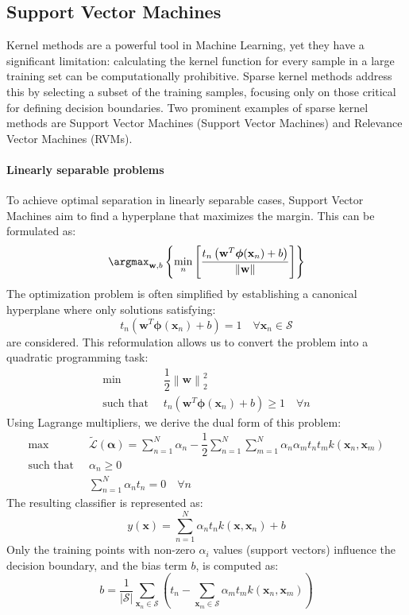 \subsection{Support Vector Machines}
Kernel methods are a powerful tool in Machine Learning, yet they have a significant limitation: calculating the kernel function for every sample in a large training set can be computationally prohibitive.
Sparse kernel methods address this by selecting a subset of the training samples, focusing only on those critical for defining decision boundaries.
Two prominent examples of sparse kernel methods are Support Vector Machines (Support Vector Machines) and Relevance Vector Machines (RVMs).

\paragraph*{Linearly separable problems}
To achieve optimal separation in linearly separable cases, Support Vector Machines aim to find a hyperplane that maximizes the margin. 
This can be formulated as:
\[\argmax_{\mathbf{w},b}\left\{\min_n\left[\dfrac{t_n\left(\mathbf{w}^T\boldsymbol{\phi}(\mathbf{x}_n)+b\right)}{\left\lVert \mathbf{w}\right\rVert }\right]\right\}\]
The optimization problem is often simplified by establishing a canonical hyperplane where only solutions satisfying:
\[t_n\left(\mathbf{w}^T\boldsymbol{\phi}(\mathbf{x}_n)+b\right)=1\quad \forall\mathbf{x}_n\in\mathcal{S}\]
are considered. 
This reformulation allows us to convert the problem into a quadratic programming task:
\begin{align*}
    \min                      \:&\: \dfrac{1}{2}{\left\lVert \mathbf{w}\right\rVert}_2^2          \\
    \text{such that }           &\: t_n\left(\mathbf{w}^T\boldsymbol{\phi}(\mathbf{x}_n)+b\right)\geq 1 \quad\forall n        
\end{align*}  
Using Lagrange multipliers, we derive the dual form of this problem:
\begin{align*}
    \max                      \:&\: \tilde{\mathcal{L}}(\boldsymbol{\alpha})=\sum_{n=1}^N \alpha_n-\dfrac{1}{2}\sum_{n=1}^N\sum_{m=1}^N \alpha_n\alpha_m t_n t_m k(\mathbf{x}_n,\mathbf{x}_m)          \\
    \text{such that }           &\: \alpha_n\geq 0 \\
                                &\: \sum_{n=1}^{N}{\alpha_n t_n = 0} \quad \forall n
\end{align*}  
The resulting classifier is represented as:
\[y(\mathbf{x})=\sum_{n=1}^{N}\alpha_n t_n k(\mathbf{x},\mathbf{x}_n)+b\]
Only the training points with non-zero $\alpha_i$ values (support vectors) influence the decision boundary, and the bias term $b$, is computed as:
\[b=\dfrac{1}{\left\lvert \mathcal{S}\right\rvert }\sum_{\mathbf{x}_n\in\mathcal{S}} \left(t_n-\sum_{\mathbf{x}_m\in\mathcal{S}}\alpha_m t_m k(\mathbf{x}_n,\mathbf{x}_m)\right)\]

